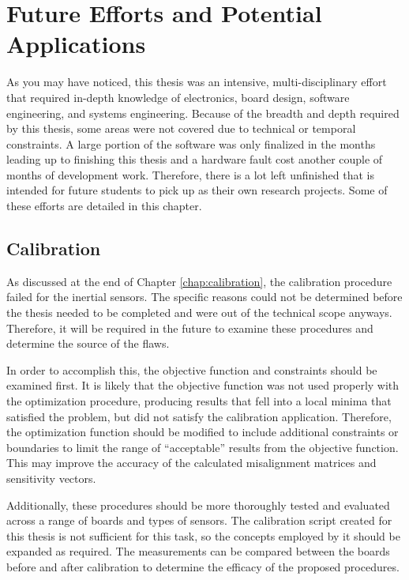 \chapter{Future Efforts and Potential Applications}
As you may have noticed, this thesis was an intensive, multi-disciplinary effort that required in-depth knowledge of electronics, board design, software engineering, and systems engineering.
Because of the breadth and depth required by this thesis, some areas were not covered due to technical or temporal constraints.
A large portion of the software was only finalized in the months leading up to finishing this thesis and a hardware fault cost another couple of months of development work.
Therefore, there is a lot left unfinished that is intended for future students to pick up as their own research projects.
Some of these efforts are detailed in this chapter.

\section{Calibration}
As discussed at the end of Chapter \ref{chap:calibration}, the calibration procedure failed for the inertial sensors.
The specific reasons could not be determined before the thesis needed to be completed and were out of the technical scope anyways.
Therefore, it will be required in the future to examine these procedures and determine the source of the flaws.

In order to accomplish this, the objective function and constraints should be examined first.
It is likely that the objective function was not used properly with the optimization procedure, producing results that fell into a local minima that satisfied the problem, but did not satisfy the calibration application.
Therefore, the optimization function should be modified to include additional constraints or boundaries to limit the range of ``acceptable'' results from the objective function.
This may improve the accuracy of the calculated misalignment matrices and sensitivity vectors.

Additionally, these procedures should be more thoroughly tested and evaluated across a range of boards and types of sensors.
The calibration script created for this thesis is not sufficient for this task, so the concepts employed by it should be expanded as required.
The measurements can be compared between the boards before and after calibration to determine the efficacy of the proposed procedures.

